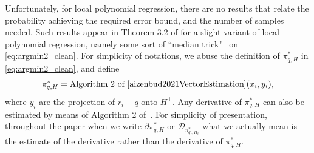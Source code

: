 \documentclass[12pt]{article}
\theoremstyle{remark}
\newcommand{\DD}{\mathcal{D}}
\begin{document}
Unfortunately, for local polynomial regression, there are no results that relate the probability achieving the required error bound, and the number of samples needed. Such results appear in Theorem 3.2 of \cite{aizenbud2021VectorEstimation} for a slight variant of local polynomial regression, namely some sort of ``median trick"~\cite{alon1999space} on \eqref{eq:argmin2_clean}. For simplicity of notations, we abuse the definition of $ \pi^*_{q, H}$ in \eqref{eq:argmin2_clean}, and define
\begin{equation}\label{eq:pi_star_median_trick}
     \pi^*_{q, H} = \mbox{Algorithm 2 of \cite{aizenbud2021VectorEstimation}} (x_i,y_i),
\end{equation}
where $y_i$ are the projection of $r_i-q$ onto $H^\perp$. 
Any derivative of $\pi^*_{q, H}$ can also be estimated by means of Algorithm 2 of~\cite{aizenbud2021VectorEstimation}. For simplicity of presentation, throughout the paper when we write $\partial \pi^*_{q, H}$ or $\DD_{\pi^*_{q_\ell,H_{\ell}}}$ what we actually mean is the estimate of the derivative rather than the derivative of $\pi^*_{q, H}$.
\end{document}

